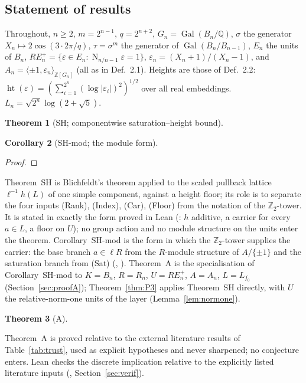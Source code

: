 \documentclass[11pt]{amsart}
\newtheorem{theorem}{Theorem}[section]
\newtheorem{corollary}[theorem]{Corollary}
\theoremstyle{remark}\newtheorem{remark}[theorem]{Remark}
\theoremstyle{definition}\newtheorem{definition}[theorem]{Definition}
\newcommand{\Q}{\mathbb{Q}}\newcommand{\Z}{\mathbb{Z}}\newcommand{\R}{\mathbb{R}}\newcommand{\F}{\mathbb{F}}
\newcommand{\RE}{RE^{+}_n}\newcommand{\ord}{\operatorname{ord}}\newcommand{\hgt}{\operatorname{ht}}
\newcommand{\Nr}{\operatorname{N}_{n/n-1}}\newcommand{\covol}{\operatorname{covol}}
\providecommand{\proofsdir}{../../proofs} %
\begin{document}
\subsection{Statement of results}\label{sec:results}
Throughout, $n\ge2$, $m=2^{n-1}$, $q=2^{n+2}$, $G_n=\operatorname{Gal}(B_n/\Q)$, $\sigma$ the generator $X_n\mapsto2\cos(3\cdot2\pi/q)$, $\tau=\sigma^{m}$ the generator of $\operatorname{Gal}(B_n/B_{n-1})$, $E_n$ the units of $B_n$, $\RE=\{\varepsilon\in E_n:\Nr\varepsilon=1\}$, $\varepsilon_n=(X_n+1)/(X_n-1)$, and $A_n=\langle\pm1,\varepsilon_n\rangle_{\Z[G_n]}$ (all as in \cite{KY} Def.~2.1). Heights are those of \cite{MO16} Def.~2.2: $\hgt(\varepsilon)=(\sum_{i=1}^{2^n}(\log|\varepsilon_i|)^2)^{1/2}$ over all real embeddings. $L_n=\sqrt{2^n}\log(2+\sqrt5)$.

\begin{theorem}[SH; componentwise saturation--height bound]\label{thm:SH}

\end{theorem}
\begin{corollary}[SH-mod; the module form]\label{cor:SHmod}

\end{corollary}
\begin{proof}

\end{proof}
Theorem~SH is Blichfeldt's theorem applied to the scaled pullback lattice $\ell^{-1}h(L)$ of one simple component, against a height floor; its role is to separate the four inputs (Rank), (Index), (Car), (Floor) from the notation of the $\Z_2$-tower. It is stated in exactly the form proved in Lean (: $h$ additive, a carrier for every $a\in L$, a floor on $U$); no group action and no module structure on the units enter the theorem. Corollary~SH-mod is the form in which the $\Z_2$-tower supplies the carrier: the base branch $a\in\ell R$ from the $R$-module structure of $A/\{\pm1\}$ and the saturation branch from (Sat) (, ). Theorem~A is the specialisation of Corollary~SH-mod to $K=B_n$, $R=R_n$, $U=\RE$, $A=A_n$, $L=L_{f_0}$ (Section~\ref{sec:proofA}); Theorem~\ref{thm:P3} applies Theorem~SH directly, with $U$ the relative-norm-one units of the layer (Lemma~\ref{lem:normone}).
\begin{theorem}[A]\label{thm:A}

\end{theorem}
Theorem~A is proved relative to the external literature results of Table~\ref{tab:trust}, used as explicit hypotheses and never sharpened; no conjecture enters. Lean checks the discrete implication relative to the explicitly listed literature inputs (, Section~\ref{sec:verif}).
\end{document}

